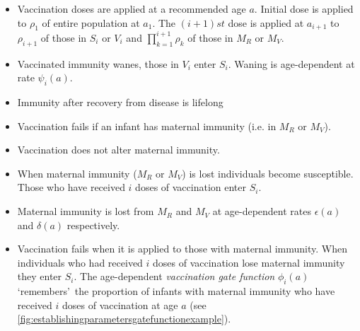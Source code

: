 \documentclass[a4paper,11pt] {scrartcl}
\begin{document}
\begin{itemize}
\item{Vaccination doses are applied at a recommended age $a$. Initial dose is applied to $\rho_1$ of entire population at $a_1$. The $(i+1)st$ dose is applied at $a_{i+1}$ to $\rho_{i+1}$ of those in $S_i$ or $V_i$ and $\prod^{i+1}_{k=1} \rho_{k}$ of those in $M_R$ or $M_V$.}
\item{Vaccinated immunity wanes, those in $V_i$ enter $S_i$. Waning is age-dependent at rate $\psi_i (a)$.}
\item{Immunity after recovery from disease is lifelong}
\item{Vaccination fails if an infant has maternal immunity (i.e. in $M_R$ or $M_V$).}
\item{Vaccination does not alter maternal immunity.}
\item{When maternal immunity ($M_R$ or $M_V$) is lost individuals become susceptible. Those who have received $i$ doses of vaccination enter $S_i$.}
\item{Maternal immunity is lost from $M_R$ and $M_V$ at age-dependent rates $\epsilon (a)$ and $\delta (a)$ respectively.}
\item{Vaccination fails when it is applied to those with maternal immunity. When individuals who had received $i$ doses of vaccination lose maternal immunity they enter $S_i$. The age-dependent \textit{vaccination gate function} $\phi_i(a)$ `remembers'\ the proportion of infants with maternal immunity who have received $i$ doses of vaccination at age $a$ (see \autoref{fig:establishingparametersgatefunctionexample}).}
\end{itemize}
\end{document}
